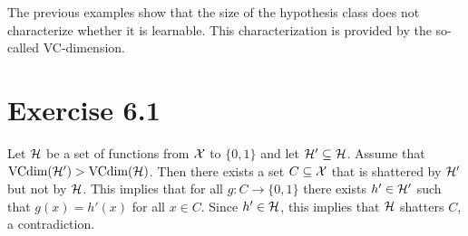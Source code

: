 The previous examples show that the size of the hypothesis class does not characterize
whether it is learnable. This characterization is provided by the so-called VC-dimension.

\section*{Exercise 6.1}

Let $\mathcal{H}$ be a set of functions from $\mathcal{X}$ to $\{0, 1\}$ and
let $\mathcal{H}' \subseteq \mathcal{H}$. Assume that $\text{VCdim} (\mathcal{H}') > \text{VCdim}
(\mathcal{H})$.  Then there exists a set $C \subseteq \mathcal{X}$ that is shattered by
$\mathcal{H}'$ but not by $\mathcal{H}$.  This implies that for all $g \colon C
\rightarrow \{0, 1\}$ there exists $h' \in \mathcal{H}'$ such that $g(x) = h'(x)$
for all $x \in C$. Since $h' \in \mathcal{H}$, this implies that $\mathcal{H}$
shatters $C$, a contradiction.

